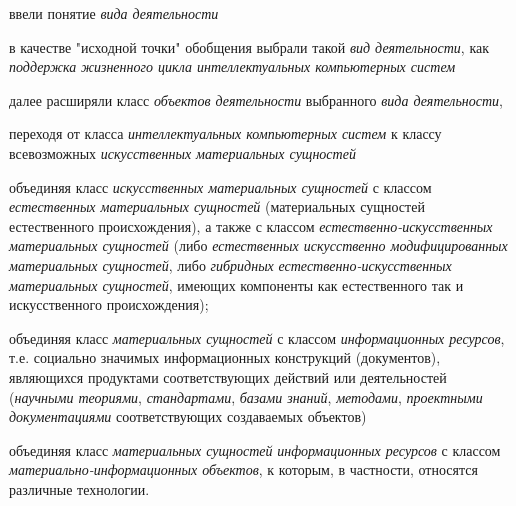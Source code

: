 \begin{textitemize}
	\item
	ввели понятие \textit{вида деятельности}
	\item
	в качестве "исходной точки"{} обобщения выбрали такой \textit{вид деятельности}, как \textit{поддержка} \textit{жизненного цикла интеллектуальных компьютерных систем}
	\item
	далее расширяли класс \textit{объектов деятельности} выбранного \textit{вида деятельности},
	
	\begin{textitemize}
		\item  переходя от класса \textit{интеллектуальных компьютерных систем} к классу всевозможных \textit{искусственных материальных сущностей}
		
		\item  объединяя класс \textit{искусственных материальных сущностей} с классом \textit{естественных материальных сущностей} (материальных сущностей естественного происхождения), а также с классом \textit{естественно-искусственных материальных сущностей} (либо \textit{естественных искусственно модифицированных материальных сущностей}, либо \textit{гибридных} \textit{естественно-искусственных материальных сущностей}, имеющих компоненты как естественного так и искусственного происхождения);
		
		\item объединяя класс \textit{материальных сущностей} с классом \textit{информационных ресурсов}, т.е. социально значимых информационных конструкций (документов), являющихся продуктами соответствующих действий или деятельностей (\textit{научными теориями}, \textit{стандартами}, \textit{базами знаний}, \textit{методами}, \textit{проектными документациями} соответствующих создаваемых объектов)
		
		\item объединяя класс \textit{материальных сущностей} \textit{информационных ресурсов} с классом \textit{материально-информационных объектов}, к которым, в частности, относятся различные технологии.
	\end{textitemize}
\end{textitemize}

